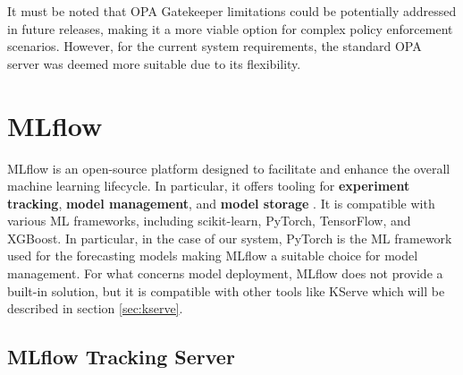 It must be noted that OPA Gatekeeper limitations could be potentially addressed in future releases, making it a more viable option for complex policy enforcement scenarios. 
However, for the current system requirements, the standard OPA server was deemed more suitable due to its flexibility.

\section{MLflow}

MLflow is an open-source platform designed to facilitate and enhance the overall machine learning lifecycle. 
In particular, it offers tooling for \textbf{experiment tracking}, \textbf{model management}, and \textbf{model storage} \cite{mlflow_docs}.
It is compatible with various ML frameworks, including scikit-learn, PyTorch, TensorFlow, and XGBoost.
In particular, in the case of our system, PyTorch is the ML framework used for the forecasting models making MLflow a suitable choice for model management.
For what concerns model deployment, MLflow does not provide a built-in solution, but it is compatible with other tools like KServe which will be described in section \ref{sec:kserve}.

\subsection{MLflow Tracking Server}
\label{sec:mlflow_tracking_server}

